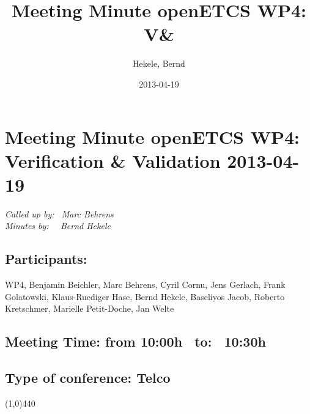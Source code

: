 \documentclass[a4paper]{article}
\title{Meeting Minute openETCS WP4: V&\V}
\author{Hekele, Bernd}
\date{2013-04-19}
\begin{document}
\section*{\large{Meeting Minute openETCS WP4: Verification \& Validation 2013-04-19}}

\emph{Called up by: \ Marc Behrens}\\
\emph{Minutes by: \ \  Bernd Hekele}


\subsection*{Participants:} WP4, 
Benjamin Beichler,
Marc Behrens, 
Cyril Cornu, 
Jens Gerlach, 
Frank Golatowski, 
Klaus-Ruediger Hase, 
Bernd Hekele,
Baseliyos Jacob,
Roberto Kretschmer,
Marielle Petit-Doche, 
Jan Welte\\

\subsection*{Meeting Time: from 10:00h \ to: \ 10:30h}

\subsection*{Type of conference: Telco}

\line(1,0){440}
\end{document}
